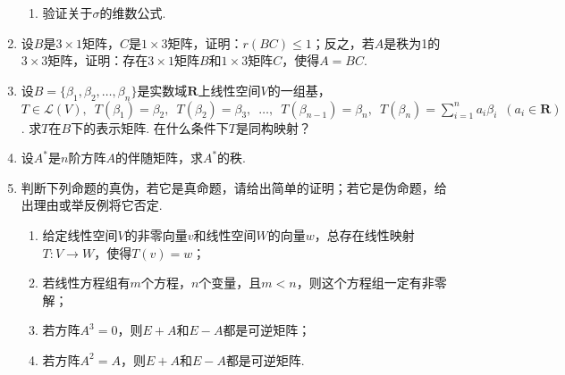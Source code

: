 \begin{enumerate}
\begin{enumerate}
        \item 验证关于$\sigma$的维数公式.
    \end{enumerate}
	\item 设$B$是$3\times 1$矩阵，$C$是$1\times 3$矩阵，证明：$r(BC)\leqslant 1$；反之，若$A$是秩为1的$3\times 3$矩阵，证明：存在$3\times 1$矩阵$B$和$1\times 3$矩阵$C$，使得$A=BC$.
	\item 设$B=\{\beta_1,\beta_2,\ldots,\beta_n\}$是实数域$\mathbf{R}$上线性空间$V$的一组基，$T\in\mathcal{L}(V),\enspace T(\beta_1)=\beta_2,\enspace T(\beta_2)=\beta_3,\enspace \ldots,\enspace T(\beta_{n-1})=\beta_n,\enspace T(\beta_n)=\sum\limits_{i=1}^{n}a_i\beta_i\enspace(a_i\in\mathbf{R})$. 求$T$在$B$下的表示矩阵. 在什么条件下$T$是同构映射？
	\item 设$A^*$是$n$阶方阵$A$的伴随矩阵，求$A^*$的秩.
	\item 判断下列命题的真伪，若它是真命题，请给出简单的证明；若它是伪命题，给出理由或举反例将它否定.
	\begin{enumerate}
        \item 给定线性空间$V$的非零向量$v$和线性空间$W$的向量$w$，总存在线性映射$T\colon V\to W$，使得$T(v)=w$；

        \item 若线性方程组有$m$个方程，$n$个变量，且$m<n$，则这个方程组一定有非零解；

        \item 若方阵$A^3=0$，则$E+A$和$E-A$都是可逆矩阵；

        \item 若方阵$A^2=A$，则$E+A$和$E-A$都是可逆矩阵.
    \end{enumerate}
\end{enumerate}

\clearpage
